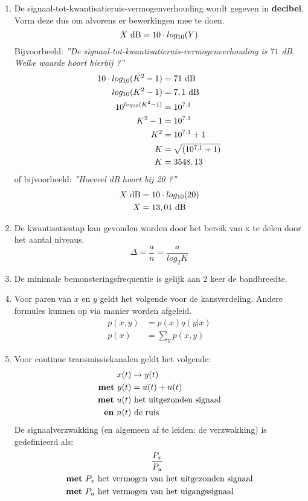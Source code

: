 \documentclass[12pt,a4paper]{article}
\begin{document}
\begin{enumerate}
\item De signaal-tot-kwantisatieruis-vermogenverhouding wordt gegeven in \textbf{decibel}. Vorm deze dus om alvorens er bewerkingen mee te doen.
$$X \text{ \si{dB}} = 10 \cdot log_{10}(Y) $$
Bijvoorbeeld: \textit{''De signaal-tot-kwantisatieruis-vermogenverhouding is $71$ \si{dB}. Welke waarde hoort hierbij ?''}
\begin{align*}
10 \cdot log_{10}(K^2 - 1) &= 71 \text{ \si{dB}}\\
log_{10}(K^2 - 1) &= 7,1 \text{ \si{dB}}\\
10^{log_{10}(K^2 - 1)} &= 10^{7,1} \\
K^2 - 1 &= 10^{7.1}\\
K^2 &= 10^{7.1} + 1\\
K &= \sqrt{(10^{7,1} + 1)}\\
K &= 3548,13
\end{align*}
of bijvoorbeeld: \textit{''Hoeveel \si{dB} hoort bij 20 ?''}
\begin{align*}
X \text{ \si{dB}} &= 10 \cdot log_{10}(20) \\
X &= 13,01 \text{ \si{dB}}
\end{align*}

\item De kwantisatiestap kan gevonden worden door het bereik van x te delen door het aantal niveaus.
$$\Delta = \frac{a}{n} = \frac{a}{log_2 K}$$

\item De minimale bemonsteringsfrequentie is gelijk aan 2 keer de bandbreedte.

\item Voor paren van $x$ en $y$ geldt het volgende voor de kansverdeling. Andere formules kunnen op via manier worden afgeleid.
\begin{align}
p(x,y) &= p(x)q(y|x) \\ p(x) &= \sum_y p(x,y)
\end{align}

\item Voor continue transmissiekanalen geldt het volgende:
\begin{align*}
x(t) &\rightarrow y(t)\\
\text{\textbf{met} } y(t) &= u(t) + n(t)\\
\text{\textbf{met} } u(t) &\text{ het uitgezonden signaal}\\
\text{\textbf{en} } n(t) &\text{ de ruis}
\end{align*}
De signaalverzwakking (en algemeen af te leiden: de verzwakking) is gedefinieerd als:
\begin{align*}
\frac{P_x}{P_u}&\\
\text{\textbf{met} } P_x \text{ het vermogen van} &\text{ het uitgezonden signaal}\\
\text{\textbf{met} } P_u \text{ het vermogen van} &\text{ het uigangssignaal}\
\end{align*}


\end{enumerate}
\end{document}
